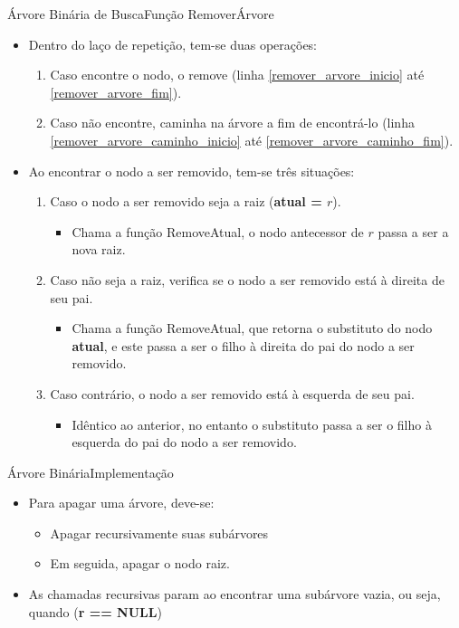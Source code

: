 \documentclass[aspectratio=169]{beamer}
\begin{document}

\begin{frame}{Árvore Binária de Busca}{Função RemoverÁrvore}
\begin{itemize}
 \item Dentro do laço de repetição, tem-se duas operações:
 \begin{enumerate}
 \item Caso encontre o nodo, o remove (linha \ref{remover_arvore_inicio} até \ref{remover_arvore_fim}).
 \item Caso não encontre, caminha na árvore a fim de encontrá-lo (linha \ref{remover_arvore_caminho_inicio} até \ref{remover_arvore_caminho_fim}).
 \end{enumerate}
 \item Ao encontrar o nodo a ser removido, tem-se três situações:
 \begin{enumerate}
  	\item Caso o nodo a ser removido seja a raiz ({\bf atual = $r$}).
    \begin{itemize}
    	\item Chama a função RemoveAtual, o nodo antecessor de $r$ passa a ser a nova raiz.
    \end{itemize}
  	\item Caso não seja a raiz, verifica se o nodo a ser removido está à direita de seu pai.
  	\begin{itemize}
  	\item Chama a função RemoveAtual, que retorna o substituto do nodo {\bf atual}, e este passa a ser o filho à direita do pai do nodo a ser removido.
  	\end{itemize}
  	\item Caso contrário, o nodo a ser removido está à esquerda de seu pai.
  	\begin{itemize}
  	\item Idêntico ao anterior, no entanto o substituto passa a ser o filho à esquerda do pai do nodo a ser removido.
  	\end{itemize}  	
 \end{enumerate} 
\end{itemize}
\end{frame}



\begin{frame}{Árvore Binária}{Implementação}
\begin{itemize}
\item Para apagar uma árvore, deve-se:
 \begin{itemize}
 \item Apagar recursivamente suas subárvores
 \item Em seguida, apagar o nodo raiz.
 \end{itemize} 
 \item As chamadas recursivas param ao encontrar uma subárvore vazia, ou seja, quando ({\bf r == NULL})
 \end{itemize} 
\end{frame}
\end{document}

